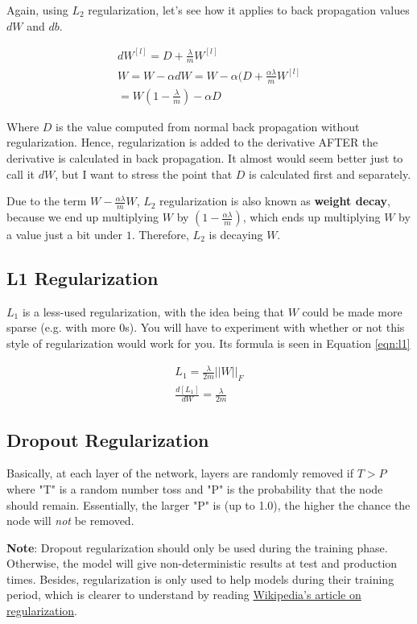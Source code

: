 \documentclass{article}
\begin{document}
Again, using $L_2$ regularization, let's see how it applies to back propagation values $dW$ and $db$.

\begin{gather}
dW^{[l]} = D + \frac{\lambda}{m} W^{[l]} \\
W = W - \alpha dW = W - \alpha (D + \frac{\alpha \lambda}{m} W^{[l]} \\
= W(1 - \frac{\lambda}{m}) - \alpha D
\end{gather}

Where $D$ is the value computed from normal back propagation without regularization.  Hence, regularization is added to the derivative AFTER the derivative is calculated in back propagation.  It almost would seem better just to call it $dW$, but I want to stress the point that $D$ is calculated first and separately.

Due to the term $W - \frac{\alpha\lambda}{m} W$, $L_2$ regularization is also known as \textbf{weight decay}, because we end up multiplying $W$ by $(1 - \frac{\alpha\lambda}{m})$, which ends up multiplying $W$ by a value just a bit under $1$.  Therefore, $L_2$ is decaying $W$.

\subsection{L1 Regularization}

$L_{1}$ is a less-used regularization, with the idea being that $W$ could be made more sparse (e.g. with more 0s).  You will have to experiment with whether or not this style of regularization would work for you.  Its formula is seen in Equation \ref{eqn:l1}

\begin{gather} \label{eqn:l1}
L_{1} = \frac{\lambda}{2m} ||W||_{F} \\
\frac{d[L_{1}]}{dW} = \frac{\lambda}{2m}
\end{gather}

\subsection{Dropout Regularization}

Basically, at each layer of the network, layers are randomly removed if $T > P$ where "T" is a random number toss and "P" is the probability that the node should remain.  Essentially, the larger "P" is (up to 1.0), the higher the chance the node will \textit{not} be removed.

\textbf{Note}: Dropout regularization should only be used during the training phase.  Otherwise, the model will give non-deterministic results at test and production times.  Besides, regularization is only used to help models during their training period, which is clearer to understand by reading \href{https://en.wikipedia.org/wiki/Regularization_(mathematics)}{Wikipedia's article on regularization}.
\end{document}
